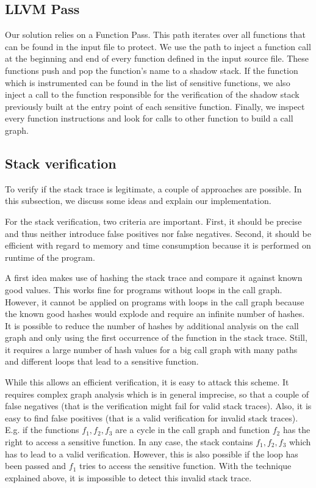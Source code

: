 \documentclass{llncs}
\begin{document}
\subsection{LLVM Pass}
Our solution relies on a Function Pass. This path iterates over all functions that can be found in the input file to protect. We use the path to inject a function call at the beginning and end of every function defined in the input source file. These functions push and pop the function's name to a shadow stack. If the function which is instrumented can be found in the list of sensitive functions, we also inject a call to the function responsible for the verification of the shadow stack previously built at the entry point of each sensitive function. Finally, we inspect every function instructions and look for calls to other function to build a call graph.

\subsection{Stack verification}
To verify if the stack trace is legitimate, a couple of approaches are possible. In this subsection, we discuss some ideas and explain our implementation.

For the stack verification, two criteria are important. First, it should be precise and thus neither introduce false positives nor false negatives. Second, it should be efficient with regard to memory and time consumption because it is performed on runtime of the program.

A first idea makes use of hashing the stack trace and compare it against known good values. This works fine for programs without loops in the call graph. However, it cannot be applied on programs with loops in the call graph because the known good hashes would explode and require an infinite number of hashes. It is possible to reduce the number of hashes by additional analysis on the call graph and only using the first occurrence of the function in the stack trace. Still, it requires a large number of hash values for a big call graph with many paths and different loops that lead to a sensitive function.

While this allows an efficient verification, it is easy to attack this scheme. It requires complex graph analysis which is in general imprecise, so that a couple of false negatives (that is the verification might fail for valid stack traces). Also, it is easy to find false positives (that is a valid verification for invalid stack traces). E.g. if the functions $f_1, f_2, f_3$ are a cycle in the call graph and function $f_2$ has the right to access a sensitive function. In any case, the stack contains $f_1, f_2, f_3$ which has to lead to a valid verification. However, this is also possible if the loop has been passed and $f_1$ tries to access the sensitive function. With the technique explained above, it is impossible to detect this invalid stack trace.
\end{document}
